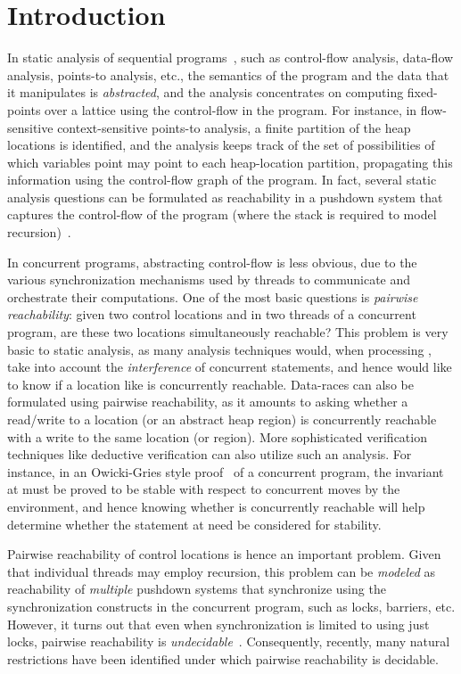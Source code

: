 \documentclass{LMCS}
\begin{document}
 \section{Introduction}
In static analysis of sequential programs~\cite{muchnick}, such as
control-flow analysis, data-flow analysis, points-to analysis, etc., 
the semantics of the program and the data that it manipulates is \emph{abstracted}, and the
analysis concentrates on computing fixed-points over a lattice using
the control-flow in the program. For instance, in flow-sensitive
context-sensitive points-to analysis, a finite partition of the heap
locations is identified, and the analysis keeps track of the set of
possibilities of which variables point may point to each heap-location
partition, propagating this information using the control-flow graph
of the program. In fact, several static analysis questions can be
formulated as reachability in a pushdown system that captures the
control-flow of the program (where the stack is required to model
recursion)~\cite{HorowitzRepsSagiv}.

In concurrent programs, abstracting control-flow is less obvious, due to the
various synchronization mechanisms used by threads to communicate and orchestrate
their computations.
One of the most basic questions is \emph{pairwise reachability}: given
two control locations  and  in two threads of a concurrent
program, are these two locations simultaneously reachable? This
problem is very basic to static analysis, as many analysis techniques
would, when processing , take into account the \emph{interference} of
concurrent statements, and hence would like to know if a location like
 is concurrently reachable. Data-races can also be formulated
using pairwise reachability, as it amounts to asking whether a
read/write to a location (or an abstract heap region) is concurrently
reachable with a write to the same location (or region). More
sophisticated verification techniques like deductive verification can
also utilize such an analysis. For instance, in an Owicki-Gries style
proof~\cite{og76} of a concurrent program, the invariant at 
must be proved to be stable with respect to concurrent moves by the
environment, and hence knowing whether  is concurrently
reachable will help determine whether the statement at  need be
considered for stability.

Pairwise reachability of control locations is hence an important
problem. Given that individual threads may employ recursion, this
problem can be \emph{modeled} as reachability of \emph{multiple}
pushdown systems that synchronize using the synchronization constructs
in the concurrent program, such as locks, barriers, etc. However, it
turns out that even when synchronization is limited to using just
locks, pairwise reachability is
\emph{undecidable}~\cite{ram00}.   Consequently, recently, many natural
restrictions have been identified under which pairwise reachability is
decidable.
\end{document}

